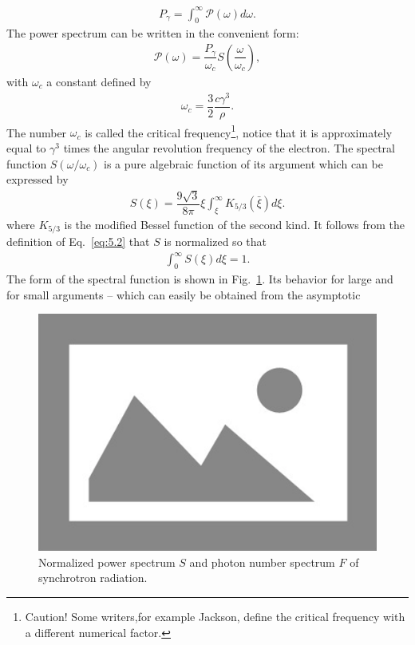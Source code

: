 \begin{align}
	P_\gamma = \int_0^{\infty} \mathscr{P}(\omega) d\omega.
\end{align}
The power spectrum can be written in the convenient form:
\begin{align} \label{eq:5.2}
	\mathscr{P}(\omega) = \dfrac{P_\gamma}{\omega_c} S\left( \dfrac{\omega}{\omega_c} \right),
\end{align}
with $\omega_c$ a constant defined by
\begin{align}
	\omega_c = \dfrac{3}{2} \dfrac{c \gamma^3}{\rho}.
\end{align}
The number $\omega_c$ is called the critical frequency\footnote{Caution!
 Some writers,for example Jackson, define the critical frequency with a different numerical factor.}, notice that it is approximately equal to $\gamma^3$ times the angular revolution
 frequency of the electron. The spectral function $S(\omega/\omega_c)$ is a pure algebraic
 function of its argument which can be expressed by
\begin{align}
	S(\xi) = \dfrac{9 \sqrt{3}}{8\pi} \xi \int_\xi^{\infty} K_{5/3} (\bar{\xi}) d\xi.
\end{align}
where $K_{5/3}$ is the modified Bessel function of the second kind. It follows from the definition of Eq.~\eqref{eq:5.2} that $S$ is normalized so that
\begin{align}
	\int_0^{\infty} S(\xi) d\xi = 1.
\end{align}
The form of the spectral function is shown in Fig.~\ref{fig:fig42}. Its behavior for large and for small arguments -- which can easily be obtained from the asymptotic
\begin{figure}[!htb]
	\centering
	\includegraphics[width=0.8\linewidth]{./Figuras/placeholder.png}
	\caption{Normalized power spectrum $S$ and photon number spectrum $F$ of synchrotron radiation.}
	\label{fig:fig42}
\end{figure}
